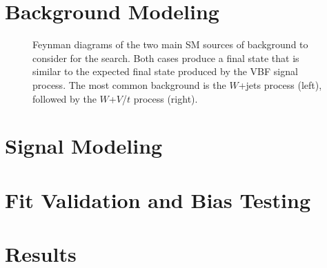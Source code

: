 \section{Background Modeling}
\label{sec:bkg}

\begin{figure}[htbp]
  \centering
  
  \caption{Feynman diagrams of the two main SM sources of background to consider for the search. Both cases produce a final state that is similar to the expected final state produced by the VBF signal process. The most common background is the $W$+jets process (left), followed by the $W$+$V$/$t$ process (right).}
  \label{fig:bkgFeynman}
\end{figure}

\section{Signal Modeling}
\label{sec:sig}

\section{Fit Validation and Bias Testing}
\label{sec:bias}

\section{Results}
\label{sec:results}
